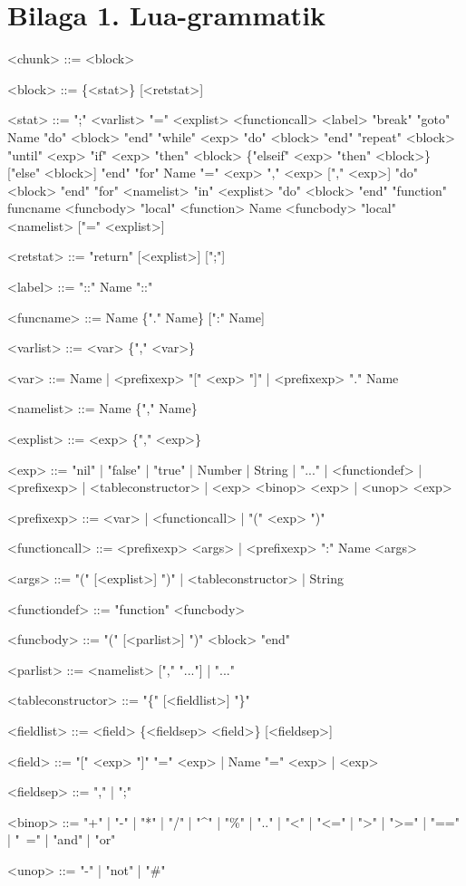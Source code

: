\thispagestyle{empty}
\section*{Bilaga 1. Lua-grammatik}

\begin{grammar}
  \singlespace\small%
  \selectfont

  <chunk> ::= <block>

  <block> ::= \{<stat>\} [<retstat>]

  <stat> ::=  ";"
     \alt <varlist> "=" <explist>
     \alt <functioncall>
     \alt <label>
     \alt "break"
     \alt "goto" Name
     \alt "do" <block> "end"
     \alt "while" <exp> "do" <block> "end"
     \alt "repeat" <block> "until" <exp>
     \alt "if" <exp> "then" <block> \{"elseif" <exp> "then" <block>\} ["else" <block>] "end"
     \alt "for" Name "=" <exp> "," <exp> ["," <exp>] "do" <block> "end"
     \alt "for" <namelist> "in" <explist> "do" <block> "end"
     \alt "function" funcname <funcbody>
     \alt "local" <function> Name <funcbody>
     \alt "local" <namelist> ["=" <explist>]

  <retstat> ::= "return" [<explist>] [";"]

  <label> ::= "::" Name "::"

  <funcname> ::= Name \{"." Name\} [":" Name]

  <varlist> ::= <var> \{"," <var>\}

  <var> ::= Name | <prefixexp> "[" <exp> "]" | <prefixexp> "." Name

  <namelist> ::= Name \{"," Name\}

  <explist> ::= <exp> \{"," <exp>\}

  <exp> ::=  "nil" | "false" | "true" | Number | String | "..." | <functiondef> |
     <prefixexp> | <tableconstructor> | <exp> <binop> <exp> | <unop> <exp>

  <prefixexp> ::= <var> | <functioncall> | "(" <exp> ")"

  <functioncall> ::=  <prefixexp> <args> | <prefixexp> ":" Name <args>

  <args> ::=  "(" [<explist>] ")" | <tableconstructor> | String

  <functiondef> ::= "function" <funcbody>

  <funcbody> ::= "(" [<parlist>] ")" <block> "end"

  <parlist> ::= <namelist> ["," "..."] | "..."

  <tableconstructor> ::= "\{" [<fieldlist>] "\}"

  <fieldlist> ::= <field> \{<fieldsep> <field>\} [<fieldsep>]

  <field> ::= "[" <exp> "]" "=" <exp> | Name "=" <exp> | <exp>

  <fieldsep> ::= "," | ";"

  <binop> ::= "+" | "-" | "*" | "/" | "\textasciicircum" | "\%" | ".." |
     "<" | "<=" | ">" | ">=" | "==" | "~=" |
     "and" | "or"

  <unop> ::= "-" | "not" | "\#"
\end{grammar}

